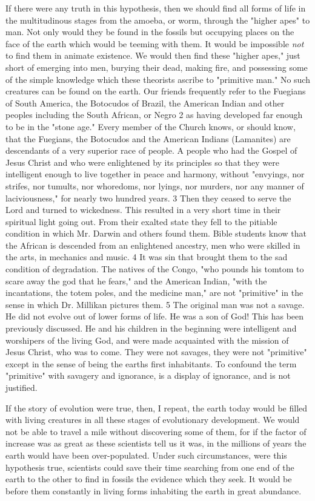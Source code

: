 If there were any truth in this hypothesis, then we should find all forms of life in the
multitudinous stages from the amoeba, or worm, through the "higher apes" to man. Not only
would they be found in the fossils but occupying places on the face of the earth which would
be teeming with them. It would be impossible \textit{not} to find them in animate existence. We
would then find these "higher apes," just short of emerging into men, burying their dead,
making fire, and possessing some of the simple knowledge which these theorists ascribe to
"primitive man." No such creatures can be found on the earth. Our friends frequently refer to
the Fuegians of South America, the Botocudos of Brazil, the American Indian and other
peoples including the South African, or Negro 2 as having developed far enough to be in the
"stone age." Every member of the Church knows, or should know, that the Fuegians, the
Botocudos and the American Indians (Lamanites) are descendants of a very superior race of
people. A people who had the Gospel of Jesus Christ and who were enlightened by its
principles so that they were intelligent enough to live together in peace and harmony, without
"envyings, nor strifes, nor tumults, nor whoredoms, nor lyings, nor murders, nor any manner
of laciviousness," for nearly two hundred years. 3 Then they ceased to serve the Lord and
turned to wickedness. This resulted in a very short time in their spiritual light going out.
From their exalted state they fell to the pitiable condition in which Mr. Darwin and others
found them. Bible students know that the African is descended from an enlightened ancestry,
men who were skilled in the arts, in mechanics and music. 4 It was sin that brought them to
the sad condition of degradation. The natives of the Congo, "who pounds his tomtom to scare
away the god that he fears," and the American Indian, "with the incantations, the totem poles,
and the medicine man," are not "primitive" in the sense in which Dr. Millikan pictures them.
5 The original man was not a savage. He did not evolve out of lower forms of life. He was a
son of God! This has been previously discussed. He and his children in the beginning were
intelligent and worshipers of the living God, and were made acquainted with the mission of
Jesus Christ, who was to come. They were not savages, they were not "primitive" except in
the sense of being the earths first inhabitants. To confound the term "primitive" with
savagery and ignorance, is a display of ignorance, and is not justified.

If the story of evolution were true, then, I repeat, the earth today would be filled with living
creatures in all these stages of evolutionary development. We would not be able to travel a
mile without discovering some of them, for if the factor of increase was as great as these
scientists tell us it was, in the millions of years the earth would have been over-populated.
Under such circumstances, were this hypothesis true, scientists could save their time
searching from one end of the earth to the other to find in fossils the evidence which they
seek. It would be before them constantly in living forms inhabiting the earth in great
abundance.

